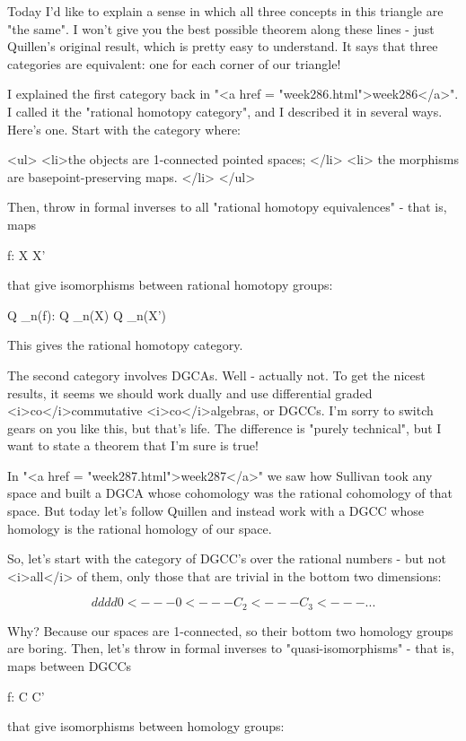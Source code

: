 Today I'd like to explain a sense in which all three concepts in this
triangle are "the same".  I won't give you the best possible
theorem along these lines - just Quillen's original result, which is
pretty easy to understand.  It says that three categories are
equivalent: one for each corner of our triangle!

I explained the first category back in "<a href =
"week286.html">week286</a>".  I called it the "rational
homotopy category", and I described it in several ways.  Here's
one.  Start with the category where:

<ul>
<li>the
objects are 1-connected pointed spaces;
</li>
<li>
the morphisms are basepoint-preserving maps.
</li>
</ul>

Then, throw in formal inverses to all "rational homotopy
equivalences" - that is, maps

f: X \to  X'

that give isomorphisms between rational homotopy groups:

Q \otimes  \pi _{n}(f): Q \otimes  \pi _{n}(X) 
\to  Q \otimes  \pi _{n}(X')

This gives the rational homotopy category.

The second category involves DGCAs.  Well - actually not.  To get the
nicest results, it seems we should work dually and use differential
graded <i>co</i>commutative <i>co</i>algebras, or DGCCs.  I'm sorry to
switch gears on you like this, but that's life.  The difference is
"purely technical", but I want to state a theorem that I'm
sure is true!

In "<a href = "week287.html">week287</a>" we saw how
Sullivan took any space and built a DGCA whose cohomology was the
rational cohomology of that space.  But today let's follow
Quillen and instead work with a DGCC whose homology is the rational
homology of our space.  

So, let's start with the category of DGCC's over the rational
numbers - but not <i>all</i> of them, only those that are trivial in
the bottom two dimensions:

$$
    d      d       d       d
0 <--- 0 <--- C_{2} <--- C_{3} <--- ...
$$
    

Why?  Because our spaces are 1-connected, so their bottom two
homology groups are boring.  Then, let's throw in formal inverses to
"quasi-isomorphisms" - that is, maps between DGCCs

f: C \to  C'

that give isomorphisms between homology groups:

